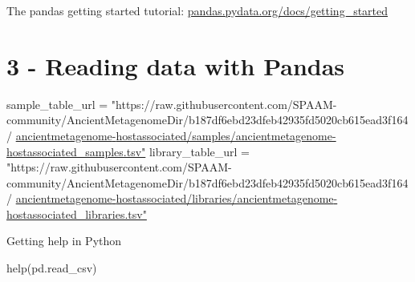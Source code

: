 \documentclass[
  letterpaper,
]{book}
\newenvironment{Shaded}{}{}
\newcommand{\BuiltInTok}[1]{\textcolor[rgb]{0.84,0.23,0.29}{#1}}
\newcommand{\ErrorTok}[1]{\textcolor[rgb]{1.00,0.33,0.33}{\underline{#1}}}
\newcommand{\NormalTok}[1]{\textcolor[rgb]{0.14,0.16,0.18}{#1}}
\newcommand{\OperatorTok}[1]{\textcolor[rgb]{0.14,0.16,0.18}{#1}}
\newcommand{\StringTok}[1]{\textcolor[rgb]{0.01,0.18,0.38}{#1}}
\begin{document}
The pandas getting started tutorial:
\href{https://pandas.pydata.org/docs/getting_started/index.html\#}{pandas.pydata.org/docs/getting\_started}

\hypertarget{reading-data-with-pandas}{%
\section{3 - Reading data with Pandas}\label{reading-data-with-pandas}}

\begin{Shaded}
\begin{Highlighting}[]
\NormalTok{sample\_table\_url }\OperatorTok{=} \StringTok{"https://raw.githubusercontent.com/SPAAM{-}community/AncientMetagenomeDir/b187df6ebd23dfeb42935fd5020cb615ead3f164/}
\ErrorTok{ancientmetagenome{-}hostassociated/samples/ancientmetagenome{-}hostassociated\_samples.tsv"}
\NormalTok{library\_table\_url }\OperatorTok{=} \StringTok{"https://raw.githubusercontent.com/SPAAM{-}community/AncientMetagenomeDir/b187df6ebd23dfeb42935fd5020cb615ead3f164/}
\ErrorTok{ancientmetagenome{-}hostassociated/libraries/ancientmetagenome{-}hostassociated\_libraries.tsv"}
\end{Highlighting}
\end{Shaded}

Getting help in Python

\begin{Shaded}
\begin{Highlighting}[]
\BuiltInTok{help}\NormalTok{(pd.read\_csv)}
\end{Highlighting}
\end{Shaded}
\end{document}
